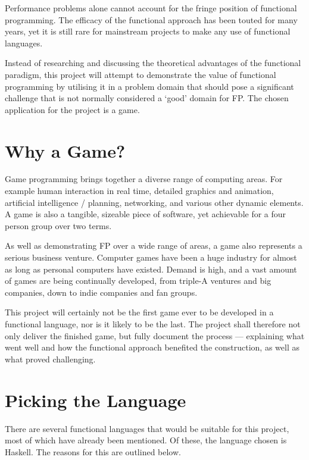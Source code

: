 Performance problems alone cannot account for the fringe position of functional programming. The efficacy of the functional approach has been touted for many years, yet it is still rare for mainstream projects to make any use of functional languages.

Instead of researching and discussing the theoretical advantages of the functional paradigm, this project will attempt to demonstrate the value of functional programming by utilising it in a problem domain that should pose a significant challenge that is not normally considered a `good' domain for FP. The chosen application for the project is a game.

\section{Why a Game?}

Game programming brings together a diverse range of computing areas. For example human interaction in real time, detailed graphics and animation, artificial intelligence / planning, networking, and various other dynamic elements. A game is also a tangible, sizeable piece of software, yet achievable for a four person group over two terms.

As well as demonstrating FP over a wide range of areas, a game also represents a serious business venture.\cite{essentialFacts2012} Computer games have been a huge industry for almost as long as personal computers have existed. Demand is high, and a vast amount of games are being continually developed, from triple-A ventures and big companies, down to indie companies and fan groups.

This project will certainly not be the first game ever to be developed in a functional language, nor is it likely to be the last. The project shall therefore not only deliver the finished game, but fully document the process --- explaining what went well and how the functional approach benefited the construction, as well as what proved challenging.

\section{Picking the Language}

There are several functional languages that would be suitable for this project, most of which have already been mentioned. Of these, the language chosen is Haskell. The reasons for this are outlined below.

